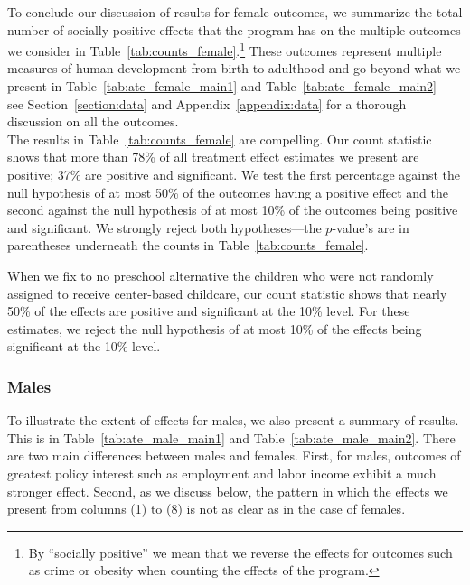 \noindent To conclude our discussion of results for female outcomes, we summarize the total number of socially positive effects that the program has on the multiple outcomes we consider in Table~\ref{tab:counts_female}.\footnote{By ``socially positive'' we mean that we reverse the effects for outcomes such as crime or obesity when counting the effects of the program.} These outcomes represent multiple measures of human development from birth to adulthood and go beyond what we present in Table~\ref{tab:ate_female_main1} and Table~\ref{tab:ate_female_main2}---see Section~\ref{section:data} and Appendix~\ref{appendix:data} for a thorough discussion on all the outcomes.\\ 

\noindent The results in Table~\ref{tab:counts_female} are compelling. Our count statistic shows that more than 78\% of all treatment effect estimates we present are positive; 37\% are positive and significant. We test the first percentage against the null hypothesis of at most 50\% of the outcomes having a positive effect and the second against the null hypothesis of at most 10\% of the outcomes being positive and significant. We strongly reject both hypotheses---the $p$-value's are in parentheses underneath the counts in Table~\ref{tab:counts_female}. 

\noindent When we fix to no preschool alternative the children who were not randomly assigned to receive center-based childcare, our count statistic shows that nearly 50\% of the effects are positive and significant at the 10\% level. For these estimates, we reject the null hypothesis of at most 10\% of the effects being significant at the 10\% level.\\





\subsubsection{Males} \label{section:centermales}

\noindent To illustrate the extent of effects for males, we also present a summary of results. This is in Table~\ref{tab:ate_male_main1} and Table~\ref{tab:ate_male_main2}. There are two main differences between males and females. First, for males, outcomes of greatest policy interest such as employment and labor income exhibit a much stronger effect. Second, as we discuss below, the pattern in which the effects we present from columns (1) to (8) is not as clear as in the case of females.\\

